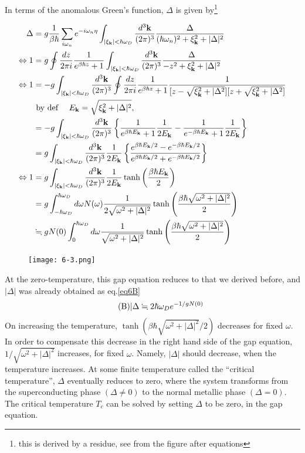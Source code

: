 In terms of the anomalous Green's function, $\Delta$ is given by\footnote{this is derived by a residue, see from the figure after equations}



\[\begin{split}
\Delta &= g\frac{1}{\beta\hbar}\sum_{i\omega_n}e^{-i\omega_n\eta}\int_{|\xi_{\bf k}|<\hbar\omega_D}\frac{d^3\bf k}{(2\pi)^3}\frac{\Delta}{(\hbar\omega_n)^2+\xi_{\bf k}^2+|\Delta|^2}\\
\Leftrightarrow 1&=g\oint \frac{dz}{2\pi i}\frac{1}{e^{\beta\hbar z}+1}\int_{|\xi_{\bf k}|<\hbar\omega_D}\frac{d^3\bf k}{(2\pi)^3}\frac{\Delta}{-z^2+\xi_{\bf k}^2+|\Delta|^2}\\
\Leftrightarrow 1&=-g\int_{|\xi_{\bf k}|<\hbar\omega_D}\frac{d^3\bf k}{(2\pi)^3}\oint \frac{dz}{2\pi i}\frac{1}{e^{\beta\hbar z}+1}\frac{1}{[z-\sqrt{\xi_{\bf k}^2+|\Delta^2}][z+\sqrt{\xi_{\bf k}^2+|\Delta^2}]}\\
&\text{ by def }\quad E_{\bf k} = \sqrt{\xi_{\bf k}^2+|\Delta|^2} ,\\
&=-g\int_{|\xi_{\bf k}|<\hbar\omega_D}\frac{d^3\bf k}{(2\pi)^3}\left\{\frac{1}{e^{\beta\hbar E_{\bf k}}+1}\frac{1}{2E_{\bf k}} - \frac{1}{e^{-\beta\hbar E_{\bf k}}+1}\frac{1}{2E_{\bf k}}\right\}\\
&=g\int_{|\xi_{\bf k}|<\hbar\omega_D}\frac{d^3\bf k}{(2\pi)^3}\frac{1}{2E_{\bf k}}\left\{\frac{e^{\beta\hbar E_{\bf k}/2} - e^{-\beta\hbar E_{\bf k}/2}}{e^{\beta\hbar E_{\bf k}/2} + e^{-\beta\hbar E_{\bf k}/2}}\right\}\\
\Leftrightarrow 1&=g\int_{|\xi_{\bf k}|<\hbar\omega_D}\frac{d^3\bf k}{(2\pi)^3}\frac{1}{2E_{\bf k}}\tanh\left(\frac{\beta\hbar E_{\bf k}}{2}\right)\\
&=g\int_{-\hbar\omega_D}^{\hbar\omega_D} d\omega N(\omega)\frac{1}{2\sqrt{\omega^2+|\Delta|^2}}\tanh\left(\frac{\beta\hbar\sqrt{\omega^2+|\Delta|^2}}{2}\right)\\
&\fallingdotseq gN(0)\int_0^{\hbar\omega_D}d\omega\frac{1}{\sqrt{\omega^2+|\Delta|^2}}\tanh\left(\frac{\beta\hbar\sqrt{\omega^2+|\Delta|^2}}{2}\right)
\end{split} \]

\begin{wrapfigure}{l}{6cm}
\texttt{[image: 6-3.png]}\
\end{wrapfigure}

At the zero-temperature, this gap equation reduces to that we derived before, and $|\Delta|$ was already obtained as eq.\eqref{eq6B}
\begin{align}\tag{B}
|\Delta \fallingdotseq 2\hbar\omega_D e^{-1/gN(0)}
\end{align}
On increasing the temperature, $\tanh({\beta\hbar\sqrt{\omega^2+|\Delta|^2}}/{2})$ decreases for fixed $\omega$. In order to compensate this decrease in the right hand side of the gap equation, $1/\sqrt{\omega^2+|\Delta|^2}$ increases, for fixed $\omega$. Namely, $|\Delta|$ should decrease, when the temperature increases. At some finite temperature called the ``critical temperature'', $\Delta$ eventually reduces to zero, where the system transforms from the superconducting phase $(\Delta\neq0)$ to the normal metallic phase $(\Delta=0)$. The critical temperature $T_c$ can be solved by setting $\Delta$ to be zero, in the gap equation. 

